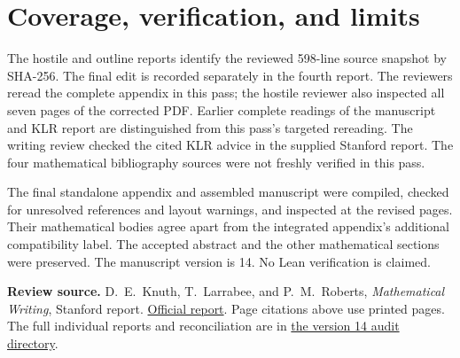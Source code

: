 \documentclass[10pt]{article}
\begin{document}
\section*{Coverage, verification, and limits}
The hostile and outline reports identify the reviewed 598-line source snapshot
by SHA-256. The final edit is recorded separately in the fourth report.
The reviewers reread the complete appendix in this pass; the hostile reviewer
also inspected all seven pages of the corrected PDF. Earlier complete readings
of the manuscript and KLR report are distinguished from this pass's targeted
rereading. The writing review checked the cited KLR advice in the supplied
Stanford report. The four mathematical bibliography sources were not freshly
verified in this pass.

The final standalone appendix and assembled manuscript were compiled, checked
for unresolved references and layout warnings, and inspected at the revised
pages. Their mathematical bodies agree apart from the integrated appendix's
additional compatibility label. The accepted abstract and the other mathematical
sections were preserved. The manuscript version is 14. No Lean verification
is claimed.

\textbf{Review source.} D.~E.~Knuth, T.~Larrabee, and P.~M.~Roberts,
\emph{Mathematical Writing}, Stanford report.
\href{https://www-cs-faculty.stanford.edu/~knuth/papers/cs1193.pdf}{Official report}.
Page citations above use printed pages. The full individual reports and
reconciliation are in
\href{https://github.com/flengyel/CategoricalEssentialIncompleteness/tree/main/Audit/2026-10-31-appendix-v14}{the version 14 audit directory}.
\end{document}
